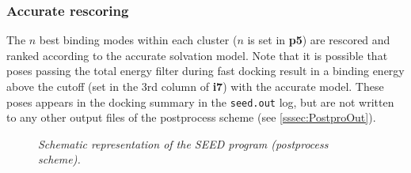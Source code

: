 \documentclass[a4paper,12pt,titlepage]{article}
\begin{document}
\subsubsection{Accurate rescoring}
\label{sssec:accurescore}
The $n$ best binding modes within each cluster ($n$ is set in {\bf p5}) are rescored and ranked 
according to the accurate solvation model. Note that it is possible that poses passing the total
energy filter during fast docking result in a binding energy above the cutoff (set in the 3rd column of {\bf i7}) with the accurate model. These poses 
appears in the docking summary in the {\tt seed.out} log, but are not written to any other
output files of the postprocess scheme (see \ref{sssec:PostproOut}).

\begin{figure}
\vspace*{-1in}
\begin{center}
\end{center}
\caption{\it Schematic representation of the SEED program (postprocess scheme).}
\end{figure} 
\end{document}
